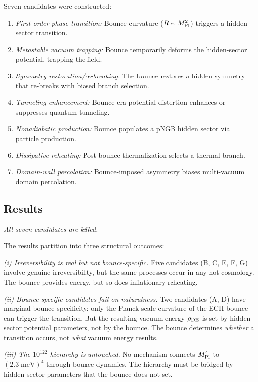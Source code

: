 \documentclass[aps,prd,twocolumn,superscriptaddress,showpacs,preprintnumbers,
  nofootinbib,longbibliography,floatfix]{revtex4-2}
\newcommand{\MPl}{M_{\rm Pl}}
\begin{document}
Seven candidates were constructed:
\begin{enumerate}[leftmargin=*,label=\Alph*.]
  \item \textit{First-order phase transition:} Bounce curvature
    ($R \sim \MPl^2$) triggers a hidden-sector transition.
  \item \textit{Metastable vacuum trapping:} Bounce temporarily deforms
    the hidden-sector potential, trapping the field.
  \item \textit{Symmetry restoration/re-breaking:} The bounce restores a
    hidden symmetry that re-breaks with biased branch selection.
  \item \textit{Tunneling enhancement:} Bounce-era potential distortion
    enhances or suppresses quantum tunneling.
  \item \textit{Nonadiabatic production:} Bounce populates a pNGB hidden
    sector via particle production.
  \item \textit{Dissipative reheating:} Post-bounce thermalization
    selects a thermal branch.
  \item \textit{Domain-wall percolation:} Bounce-imposed asymmetry biases
    multi-vacuum domain percolation.
\end{enumerate}

\subsection{Results}

\textit{All seven candidates are killed.}

The results partition into three structural outcomes:

\textit{(i) Irreversibility is real but not bounce-specific.} Five
candidates (B, C, E, F, G) involve genuine irreversibility, but the same
processes occur in any hot cosmology. The bounce provides energy, but so
does inflationary reheating.

\textit{(ii) Bounce-specific candidates fail on naturalness.} Two
candidates (A, D) have marginal bounce-specificity: only the
Planck-scale curvature of the ECH bounce can trigger the transition. But
the resulting vacuum energy $\rho_{\rm DE}$ is set by hidden-sector
potential parameters, not by the bounce. The bounce determines
\textit{whether} a transition occurs, not \textit{what} vacuum energy
results.

\textit{(iii) The $10^{122}$ hierarchy is untouched.} No mechanism
connects $\MPl^4$ to $(2.3\;\text{meV})^4$ through bounce dynamics. The
hierarchy must be bridged by hidden-sector parameters that the bounce
does not set.
\end{document}
